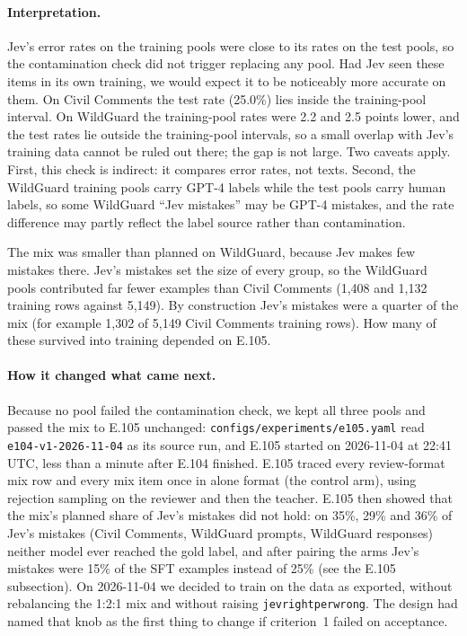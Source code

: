 \documentclass[11pt]{article}
\renewcommand{\_}{\origunderscore\allowbreak}
\begin{document}
\paragraph{Interpretation.}
Jev's error rates on the training pools were close to its rates on the test pools, so the contamination check did not trigger replacing any pool. Had Jev seen these items in its own training, we would expect it to be noticeably more accurate on them. On Civil Comments the test rate (25.0\%) lies inside the training-pool interval. On WildGuard the training-pool rates were 2.2 and 2.5 points lower, and the test rates lie outside the training-pool intervals, so a small overlap with Jev's training data cannot be ruled out there; the gap is not large. Two caveats apply. First, this check is indirect: it compares error rates, not texts. Second, the WildGuard training pools carry GPT-4 labels while the test pools carry human labels, so some WildGuard ``Jev mistakes'' may be GPT-4 mistakes, and the rate difference may partly reflect the label source rather than contamination.

The mix was smaller than planned on WildGuard, because Jev makes few mistakes there. Jev's mistakes set the size of every group, so the WildGuard pools contributed far fewer examples than Civil Comments (1,408 and 1,132 training rows against 5,149). By construction Jev's mistakes were a quarter of the mix (for example 1,302 of 5,149 Civil Comments training rows). How many of these survived into training depended on E.105.

\paragraph{How it changed what came next.}
Because no pool failed the contamination check, we kept all three pools and passed the mix to E.105 unchanged: \texttt{configs/experiments/e105.yaml} read \texttt{e104-v1-2026-11-04} as its source run, and E.105 started on 2026-11-04 at 22:41 UTC, less than a minute after E.104 finished. E.105 traced every review-format mix row and every mix item once in alone format (the control arm), using rejection sampling on the reviewer and then the teacher. E.105 then showed that the mix's planned share of Jev's mistakes did not hold: on 35\%, 29\% and 36\% of Jev's mistakes (Civil Comments, WildGuard prompts, WildGuard responses) neither model ever reached the gold label, and after pairing the arms Jev's mistakes were 15\% of the SFT examples instead of 25\% (see the E.105 subsection). On 2026-11-04 we decided to train on the data as exported, without rebalancing the 1:2:1 mix and without raising \texttt{jev\_right\_per\_wrong}. The design had named that knob as the first thing to change if criterion~1 failed on acceptance.
\end{document}
